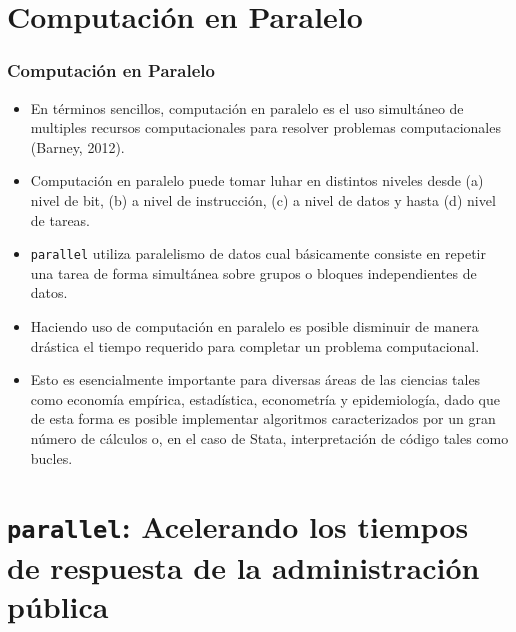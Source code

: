 \documentclass{beamer}
\begin{document}
\section{Computaci\'on en Paralelo}
\begin{frame}[allowframebreaks=.8]
\frametitle{Computaci\'on en Paralelo}

\begin{itemize}
\item En t\'erminos sencillos, computaci\'on en paralelo es el uso simult\'aneo de multiples recursos computacionales para resolver problemas computacionales (Barney, 2012).
\item Computaci\'on en paralelo puede tomar luhar en distintos niveles desde (a) nivel de bit, (b) a nivel de instrucci\'on, (c) a nivel de datos y hasta (d) nivel de tareas.
\item {\tt parallel} utiliza paralelismo de datos cual b\'asicamente consiste en repetir una tarea de forma simult\'anea sobre grupos o bloques independientes de datos.
\item Haciendo uso de computaci\'on en paralelo es posible disminuir de manera dr\'astica el tiempo requerido para completar un problema computacional.
\item Esto es esencialmente importante para diversas \'areas de las ciencias tales como econom\'ia emp\'irica, estad\'istica, econometr\'ia y epidemiolog\'ia, dado que de esta forma es posible implementar algoritmos caracterizados por un gran n\'umero de c\'alculos o, en el caso de Stata, interpretaci\'on de c\'odigo tales como bucles.
\end{itemize}

\end{frame}

\section{{\tt parallel}: Acelerando los tiempos de respuesta de la administraci\'on p\'ublica}
\end{document}
